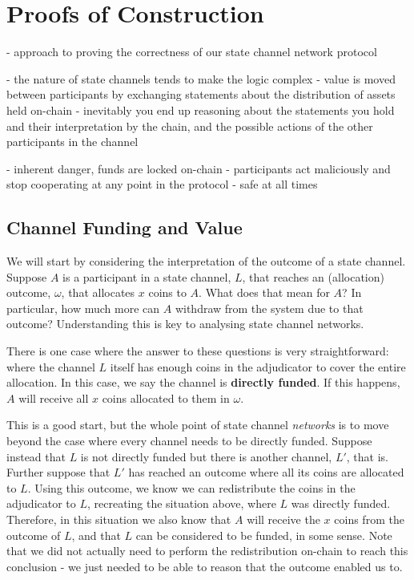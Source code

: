 \section{Proofs of Construction}\label{sec:reasoning}

- approach to proving the correctness of our state channel network protocol

- the nature of state channels tends to make the logic complex
- value is moved between participants by exchanging statements about the distribution of assets held on-chain
- inevitably you end up reasoning about the statements you hold and their interpretation by the chain, and the possible actions of the other participants in the channel

- inherent danger, funds are locked on-chain
- participants act maliciously and stop cooperating at any point in the protocol
- safe at all times

\subsection{Channel Funding and Value}

We will start by considering the interpretation of the outcome of a state channel.
Suppose $A$ is a participant in a state channel, $L$, that reaches an (allocation) outcome, $\omega$, that allocates $x$ coins to $A$.
What does that mean for $A$?
In particular, how much more can $A$ withdraw from the system due to that outcome?
Understanding this is key to analysing state channel networks.

\begin{figure}[h]\centering
  \makebox[\textwidth][c]{}
  \caption{
  }\label{fig:meaning-of-funding}
\end{figure}

There is one case where the answer to these questions is very straightforward:
where the channel $L$ itself has enough coins in the adjudicator to cover the entire allocation.
In this case, we say the channel is \textbf{directly funded}.
If this happens, $A$ will receive all $x$ coins allocated to them in $\omega$.
\begin{figure}[h]\centering
  \makebox[\textwidth][c]{}
  \caption{
  }\label{fig:direct-funding}
\end{figure}

This is a good start, but the whole point of state channel \textit{networks} is to move beyond the case where every channel needs to be directly funded.
Suppose instead that $L$ is not directly funded but there is another channel, $L'$, that is.
Further suppose that $L'$ has reached an outcome where all its coins are allocated to $L$.
Using this outcome, we know we can redistribute the coins in the adjudicator to $L$, recreating the situation above, where $L$ was directly funded.
Therefore, in this situation we also know that $A$ will receive the $x$ coins from the outcome of $L$, and that $L$ can be considered to be funded, in some sense.
Note that we did not actually need to perform the redistribution on-chain to reach this conclusion - we just needed to be able to reason that the outcome enabled us to.

